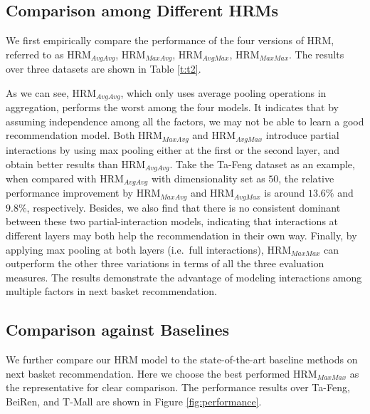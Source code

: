 \documentclass[10pt,journal,compsoc]{IEEEtran}
\begin{document}
\subsection{Comparison among Different HRMs}
We first empirically compare the performance of the four versions of HRM, referred to as HRM$_{AvgAvg}$, HRM$_{MaxAvg}$, HRM$_{AvgMax}$, HRM$_{MaxMax}$. The results over three datasets are shown in Table \ref{t:t2}.

As we can see, HRM$_{AvgAvg}$, which only uses average pooling operations in aggregation, performs the worst among the four models. It indicates that by assuming independence among all the factors, we may not be able to learn a good recommendation model. Both HRM$_{MaxAvg}$ and HRM$_{AvgMax}$ introduce partial interactions by using max pooling either at the first or the second layer, and obtain better results than HRM$_{AvgAvg}$. Take the Ta-Feng dataset as an example, when compared with HRM$_{AvgAvg}$ with dimensionality set as $50$, the relative performance improvement by HRM$_{MaxAvg}$ and HRM$_{AvgMax}$ is around $13.6\%$ and $9.8\%$, respectively. Besides, we also find that there is no consistent dominant between these two partial-interaction models, indicating that interactions at different layers may both help the recommendation in their own way. Finally, by applying max pooling at both layers (i.e.~full interactions), HRM$_{MaxMax}$ can outperform the other three variations in terms of all the three evaluation measures. The results demonstrate the advantage of modeling interactions among multiple factors in next basket recommendation.

\subsection{Comparison against Baselines}
We further compare our HRM model to the state-of-the-art baseline methods on next basket recommendation. Here we choose the best performed HRM$_{MaxMax}$ as the representative for clear comparison. The performance results over Ta-Feng, BeiRen, and T-Mall are shown in Figure \ref{fig:performance}.
\end{document}
